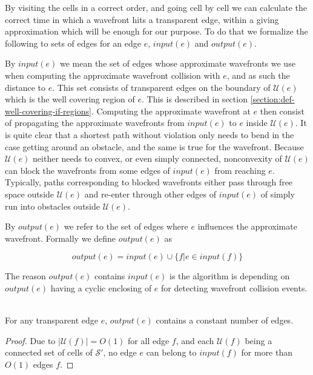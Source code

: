 By visiting the cells in a correct order, and going cell by cell we can calculate the 
correct time in which a wavefront hits a transparent edge, within a giving 
approximation which will be enough for our purpose. To do that we formalize the 
following to sets of edges for an edge $e$, $input(e)$ and $output(e)$.

By $input(e)$ we mean the set of edges whose approximate wavefronts we use when computing 
the approximate wavefront collision with $e$, and as such the distance to $e$. This set 
consists of transparent edges on the boundary of $\mathcal{U}(e)$ which is the well covering 
region of $e$. This is described in section \ref{section:def-well-covering-if-regions}.
Computing the approximate wavefront at $e$ then consist of propagating the approximate 
wavefronts from $input(e)$ to $e$ inside $\mathcal{U}(e)$. It is quite clear that a shortest 
path without violation only needs to bend in the case getting around an obstacle, and the 
same is true for the wavefront. Because $\mathcal{U}(e)$ neither needs to convex, or even 
simply connected, nonconvexity of $\mathcal{U}(e)$ can block the wavefronts from some edges 
of $input(e)$ from reaching $e$. Typically, paths corresponding to blocked wavefronts either 
pass through free space outside $\mathcal{U}(e)$ and re-enter through other edges of 
$input(e)$ of simply run into obstacles outside $\mathcal{U}(e)$. 

By $output(e)$ we refer to the set of edges where $e$ influences the approximate wavefront. 
Formally we define $output(e)$ as 

$$output(e) = input(e) \cup \{ f | e \in input(f) \}$$

The reason $output(e)$ contains $input(e)$ is the algorithm is depending on $output(e)$ 
having a cyclic enclosing of $e$ for detecting wavefront collision events.

\begin{Lemma} \label{lemma:4.1} \hspace{1cm} \\
For any transparent edge $e$, $output(e)$ contains a constant number of edges.
\end{Lemma}
\begin{proof}
	Due to $|\mathcal{U}(f)| = O(1)$ for all edge $f$, and each $\mathcal{U}(f)$ being a 
    connected set of cells of $\mathcal{S}'$, no edge $e$ can belong to $input(f)$ for more 
    than $O(1)$ edges $f$.
\end{proof}

